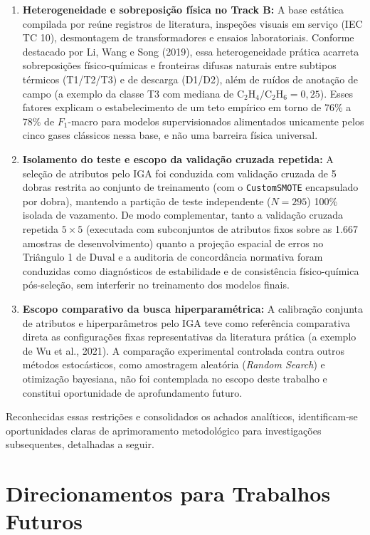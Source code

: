 \begin{enumerate}
    \item \textbf{Heterogeneidade e sobreposição física no Track B:} A base estática compilada por  reúne registros de literatura, inspeções visuais em serviço (IEC TC 10), desmontagem de transformadores e ensaios laboratoriais. Conforme destacado por Li, Wang e Song (2019), essa heterogeneidade prática acarreta sobreposições físico-químicas e fronteiras difusas naturais entre subtipos térmicos (T1/T2/T3) e de descarga (D1/D2), além de ruídos de anotação de campo (a exemplo da classe T3 com mediana de $\text{C}_2\text{H}_4/\text{C}_2\text{H}_6 = 0,25$). Esses fatores explicam o estabelecimento de um teto empírico em torno de 76\% a 78\% de $F_1$-macro para modelos supervisionados alimentados unicamente pelos cinco gases clássicos nessa base, e não uma barreira física universal.
    \item \textbf{Isolamento do teste e escopo da validação cruzada repetida:} A seleção de atributos pelo IGA foi conduzida com validação cruzada de 5 dobras restrita ao conjunto de treinamento (com o \texttt{CustomSMOTE} encapsulado por dobra), mantendo a partição de teste independente ($N=295$) 100\% isolada de vazamento. De modo complementar, tanto a validação cruzada repetida $5 \times 5$ (executada com subconjuntos de atributos fixos sobre as 1.667 amostras de desenvolvimento) quanto a projeção espacial de erros no Triângulo 1 de Duval e a auditoria de concordância normativa foram conduzidas como diagnósticos de estabilidade e de consistência físico-química pós-seleção, sem interferir no treinamento dos modelos finais.
    \item \textbf{Escopo comparativo da busca hiperparamétrica:} A calibração conjunta de atributos e hiperparâmetros pelo IGA teve como referência comparativa direta as configurações fixas representativas da literatura prática (a exemplo de Wu et al., 2021). A comparação experimental controlada contra outros métodos estocásticos, como amostragem aleatória (\textit{Random Search}) e otimização bayesiana, não foi contemplada no escopo deste trabalho e constitui oportunidade de aprofundamento futuro.
\end{enumerate}

Reconhecidas essas restrições e consolidados os achados analíticos, identificam-se oportunidades claras de aprimoramento metodológico para investigações subsequentes, detalhadas a seguir.

\section{Direcionamentos para Trabalhos Futuros}\label{sec:trabalhos_futuros}

